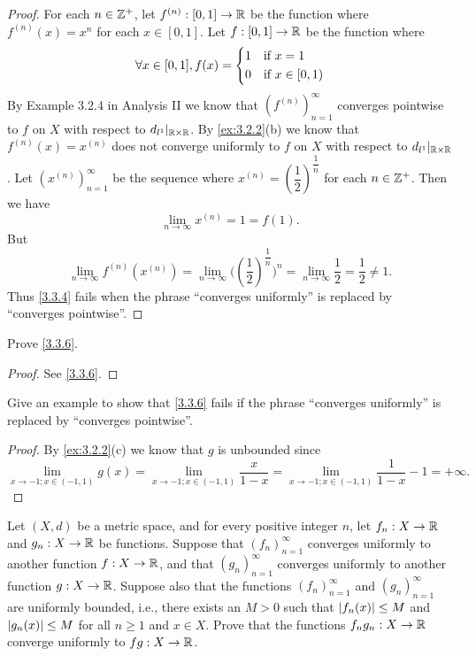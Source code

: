 \begin{proof}
  For each \(n \in \mathbb{Z}^+\), let \(f^{(n)} : [0, 1] \to \mathbb{R}\) be the function where \(f^{(n)}(x) = x^n\) for each \(x \in [0, 1]\).
  Let \(f : [0, 1] \to \mathbb{R}\) be the function where
  \[
    \forall x \in [0, 1], f(x) = \begin{dcases}
      1 & \text{if } x = 1        \\
      0 & \text{if } x \in [0, 1)
    \end{dcases}
  \]
  By Example 3.2.4 in Analysis II we know that \((f^{(n)})_{n = 1}^\infty\) converges pointwise to \(f\) on \(X\) with respect to \(d_{l^1}|_{\mathbb{R} \times \mathbb{R}}\).
  By \cref{ex:3.2.2}(b) we know that \(f^{(n)}(x) = x^{(n)}\) does not converge uniformly to \(f\) on \(X\) with respect to \(d_{l^1}|_{\mathbb{R} \times \mathbb{R}}\).
  Let \((x^{(n)})_{n = 1}^\infty\) be the sequence where \(x^{(n)} = (\dfrac{1}{2})^{\dfrac{1}{n}}\) for each \(n \in \mathbb{Z}^+\).
  Then we have
  \[
    \lim_{n \to \infty} x^{(n)} = 1 = f(1).
  \]
  But
  \[
    \lim_{n \to \infty} f^{(n)}(x^{(n)}) = \lim_{n \to \infty} \big((\dfrac{1}{2})^{\dfrac{1}{n}}\big)^n = \lim_{n \to \infty} \dfrac{1}{2} = \dfrac{1}{2} \neq 1.
  \]
  Thus \cref{3.3.4} fails when the phrase ``converges uniformly'' is replaced by ``converges pointwise''.
\end{proof}

\begin{ex}\label{ex:3.3.6}
  Prove \cref{3.3.6}.
\end{ex}

\begin{proof}
  See \cref{3.3.6}.
\end{proof}

\begin{ex}\label{ex:3.3.7}
  Give an example to show that \cref{3.3.6} fails if the phrase ``converges uniformly'' is replaced by ``converges pointwise''.
\end{ex}

\begin{proof}
  By \cref{ex:3.2.2}(c) we know that \(g\) is unbounded since
  \[
    \lim_{x \to -1 ; x \in (-1, 1)} g(x) = \lim_{x \to -1 ; x \in (-1, 1)} \dfrac{x}{1 - x} = \lim_{x \to -1 ; x \in (-1, 1)} \dfrac{1}{1 - x} - 1 = +\infty.
  \]
\end{proof}

\begin{ex}\label{ex:3.3.8}
  Let \((X, d)\) be a metric space, and for every positive integer \(n\), let \(f_n : X \to \mathbb{R}\) and \(g_n : X \to \mathbb{R}\) be functions.
  Suppose that \((f_n)_{n = 1}^\infty\) converges uniformly to another function \(f : X \to \mathbb{R}\), and that \((g_n)_{n = 1}^\infty\) converges uniformly to another function \(g : X \to \mathbb{R}\).
  Suppose also that the functions \((f_n)_{n = 1}^\infty\) and \((g_n)_{n = 1}^\infty\) are uniformly bounded, i.e., there exists an \(M > 0\) such that \(\left\lvert f_n(x)\right\rvert \leq M\) and \(\left\lvert g_n(x)\right\rvert \leq M\) for all \(n \geq 1\) and \(x \in X\).
  Prove that the functions \(f_n g_n : X \to \mathbb{R}\) converge uniformly to \(fg : X \to \mathbb{R}\).
\end{ex}

